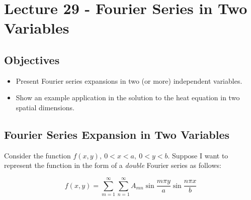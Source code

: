 \chapter{Lecture 29 - Fourier Series in Two Variables}
\label{ch:lec29}
\section{Objectives}
\begin{itemize}
\item Present Fourier series expansions in two (or more) independent variables.
\item Show an example application in the solution to the heat equation in two spatial dimensions.
\end{itemize}
\setcounter{lstannotation}{0}

\section{Fourier Series Expansion in Two Variables}

Consider the function $f(x,y), \ 0<x<a, \ 0<y<b$.  Suppose I want to represent the function in the form of a \emph{double} Fourier series as follows:

\begin{equation}
f(x,y) = \sum\limits_{m=1}^{\infty}\sum\limits_{n=1}^{\infty} A_{mn}\sin{\frac{m\pi y}{a}} \sin{\frac{n \pi x}{b}}
\label{eq:double-fourier}
\end{equation}

